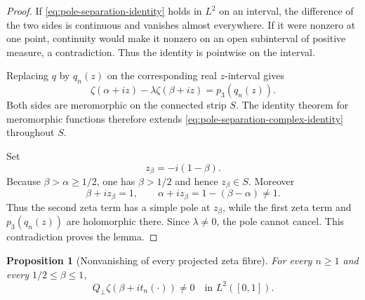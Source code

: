 \documentclass[11pt]{amsart}
\numberwithin{equation}{section}
\newtheorem{proposition}[theorem]{Proposition}
\begin{document}
\begin{proof}
If \eqref{eq:pole-separation-identity} holds in $L^2$ on an interval, the
difference of the two sides is continuous and vanishes almost everywhere.
If it were nonzero at one point, continuity would make it nonzero on an open
subinterval of positive measure, a contradiction.  Thus the identity is
pointwise on the interval.

Replacing $q$ by $q_n(z)$ on the corresponding real $z$-interval gives
\begin{equation}
 \zeta(\alpha+iz)
 -\lambda\zeta(\beta+iz)
 =p_3(q_n(z)).
 \label{eq:pole-separation-complex-identity}
\end{equation}
Both sides are meromorphic on the connected strip $S$.  The identity theorem
for meromorphic functions \cite{Ahlfors1979} therefore extends
\eqref{eq:pole-separation-complex-identity} throughout $S$.

Set
\begin{equation}
 z_\beta=-i(1-\beta).
 \label{eq:z-beta-pole}
\end{equation}
Because $\beta>\alpha\geq1/2$, one has $\beta>1/2$ and hence
$z_\beta\in S$.  Moreover
\begin{equation}
 \beta+iz_\beta=1,
 \qquad
 \alpha+iz_\beta=1-(\beta-\alpha)\neq1.
 \label{eq:pole-values}
\end{equation}
Thus the second zeta term has a simple pole at $z_\beta$, while the first zeta
term and $p_3(q_n(z))$ are holomorphic there.  Since $\lambda\neq0$, the pole
cannot cancel.  This contradiction proves the lemma.
\end{proof}

\begin{proposition}[Nonvanishing of every projected zeta fibre]
\label{prop:projected-nonzero}
For every $n\geq1$ and every $1/2\leq\beta\leq1$,
\begin{equation}
 \boxed{
 Q_\perp\zeta(\beta+i t_n(\cdot))\neq0
 \quad\text{in }L^2([0,1]).
 }
 \label{eq:projected-nonzero}
\end{equation}
\end{proposition}
\end{document}
